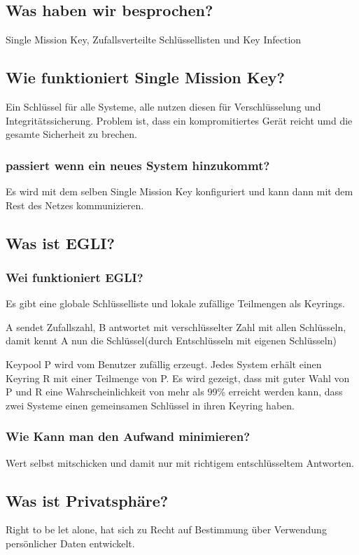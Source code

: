 	\subsection{Was haben wir besprochen?}
	Single Mission Key, Zufallsverteilte Schlüssellisten und Key Infection
	
	\subsection{Wie funktioniert Single Mission Key?}
	Ein Schlüssel für alle Systeme, alle nutzen diesen für Verschlüsselung und Integritätssicherung. Problem ist, dass ein kompromitiertes Gerät reicht umd die gesamte Sicherheit zu brechen.
	\subsubsection{passiert wenn ein neues System hinzukommt?}
	Es wird mit dem selben Single Mission Key konfiguriert und kann dann mit dem Rest des Netzes kommunizieren.
	
	\subsection{Was ist EGLI?}
	\subsubsection{Wei funktioniert EGLI?}
	Es gibt eine globale Schlüsselliste und lokale zufällige Teilmengen als Keyrings.
	
	A sendet Zufallszahl, B antwortet mit verschlüsselter Zahl mit allen Schlüsseln, damit kennt A nun die Schlüssel(durch Entschlüsseln mit eigenen Schlüsseln) 
	
	Keypool P wird vom Benutzer zufällig erzeugt. Jedes System erhält einen Keyring R mit einer Teilmenge von P. Es wird gezeigt, dass mit guter Wahl von P und R eine Wahrscheinlichkeit von mehr als 99\% erreicht werden kann, dass zwei Systeme einen gemeinsamen Schlüssel in ihren Keyring haben. 
	\subsubsection{Wie Kann man den Aufwand minimieren?}
	Wert selbst mitschicken und damit nur mit richtigem entschlüsseltem Antworten.
	
	\subsection{Was ist Privatsphäre?}
	Right to be let alone, hat sich zu Recht auf Bestimmung über Verwendung persönlicher Daten entwickelt.
